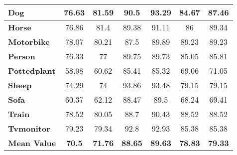 \begin{table*}[t]
{\begin{tabular}{l|c|c|c|c|c|c}
	\textbf{Dog}         & 76.63          & 81.59           & 90.5            & 93.29          & 84.67           & 87.46          \\ \hline
	\textbf{Horse}       & 76.86          & 81.4            & 89.38           & 91.11          & 86              & 89.34          \\ \hline
	\textbf{Motorbike}   & 78.07          & 80.21           & 87.5            & 89.89          & 89.23           & 89.23          \\ \hline
	\textbf{Person}      & 76.33          & 77              & 89.75           & 89.73          & 85.05           & 85.81          \\ \hline
	\textbf{Pottedplant} & 58.98          & 60.62           & 85.41           & 85.32          & 69.06           & 71.05          \\ \hline
	\textbf{Sheep}       & 74.29          & 74              & 93.86           & 93.48          & 79.15           & 79.15          \\ \hline
	\textbf{Sofa}        & 60.37          & 62.12           & 88.47           & 89.5           & 68.24           & 69.41          \\ \hline
	\textbf{Train}       & 78.52          & 80.05           & 88.7            & 90.43          & 88.52           & 88.52          \\ \hline
	\textbf{Tvmonitor}   & 79.23          & 79.34           & 92.8            & 92.93          & 85.38           & 85.38          \\ \hline
	\textbf{Mean Value}  & \textbf{70.5}  & \textbf{71.76}  & \textbf{88.65}  & \textbf{89.63} & \textbf{78.83}  & \textbf{79.33} \\ \hline
\end{tabular}
	}
	\vspace{0.0cm}
	\caption{\label{tbl:pascal_detailed}{\bf Pascal VOC dataset.} Detailed class-wise panoptic segmentation results on the Pascal VOC validation set comparing results without BCRF vs with BCRF on a standard network.}
	\vspace{0.5cm}
\end{table*}

